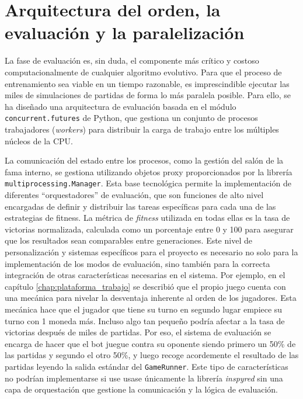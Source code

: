 \section{Arquitectura del orden, la evaluación y la paralelización} \label{sec:paralelizacion_algoritmo}

La fase de evaluación es, sin duda, el componente más crítico y costoso computacionalmente de cualquier algoritmo evolutivo. Para que el proceso de entrenamiento sea viable en un tiempo razonable, es imprescindible ejecutar las miles de simulaciones de partidas de forma lo más paralela posible. Para ello, se ha diseñado una arquitectura de evaluación basada en el módulo \texttt{concurrent.futures} de Python, que gestiona un conjunto de procesos trabajadores (\textit{workers}) para distribuir la carga de trabajo entre los múltiples núcleos de la CPU.

La comunicación del estado entre los procesos, como la gestión del salón de la fama interno, se gestiona utilizando objetos proxy proporcionados por la librería \texttt{multiprocessing.Manager}. Esta base tecnológica permite la implementación de diferentes ``orquestadores'' de evaluación, que son funciones de alto nivel encargadas de definir y distribuir las tareas específicas para cada una de las estrategias de fitness. La métrica de \textit{fitness} utilizada en todas ellas es la tasa de victorias normalizada, calculada como un porcentaje entre 0 y 100 para asegurar que los resultados sean comparables entre generaciones. Este nivel de personalización y sistemas específicos para el proyecto es necesario no solo para la implementación de los modos de evaluación, sino también para la correcta integración de otras características necesarias en el sistema. Por ejemplo, en el capítulo \ref{chap:plataforma_trabajo} se describió que el propio juego cuenta con una mecánica para nivelar la desventaja inherente al orden de los jugadores. Esta mecánica hace que el jugador que tiene su turno en segundo lugar empiece su turno con 1 moneda más. Incluso algo tan pequeño podría afectar a la tasa de victorias después de miles de partidas. Por eso, el sistema de evaluación se encarga de hacer que el bot juegue contra su oponente siendo primero un 50\% de las partidas y segundo el otro 50\%, y luego recoge acordemente el resultado de las partidas leyendo la salida estándar del \texttt{GameRunner}. Este tipo de características no podrían implementarse si use usase únicamente la librería \textit{inspyred} sin una capa de orquestación que gestione la comunicación y la lógica de evaluación.

